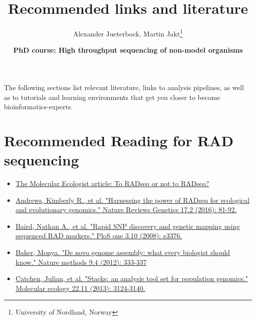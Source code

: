 \documentclass[11pt]{article}
\author{Alexander Jueterbock, Martin Jakt\thanks{University of Nordland, Norway}}
\date{\textbf{PhD course: High throughput sequencing of non-model organisms}}
\title{\textbf{Recommended links and literature}}
\begin{document}
\maketitle








The following sections list relevant literature, links to analysis
pipelines, as well as to tutorials and learning environments that get
you closer to become bioinformatics-experts.

\section{Recommended Reading for RAD sequencing}
\label{sec-1}

\begin{itemize}
\item \href{http://www.molecularecologist.com/2017/04/to-radseq-or-not-to-radseq/}{The Molecular Ecologist article: To RADseq or not to RADseq?}
\end{itemize}


\begin{itemize}
\item \href{https://www.nature.com/nrg/journal/v17/n2/full/nrg.2015.28.html}{Andrews, Kimberly R., et al. "Harnessing the power of RADseq for ecological and evolutionary genomics." Nature Reviews Genetics 17.2 (2016): 81-92.}
\end{itemize}


\begin{itemize}
\item \href{http://journals.plos.org/plosone/article?id=10.1371/journal.pone.0003376}{Baird, Nathan A., et al. "Rapid SNP discovery and genetic mapping using sequenced RAD markers." PloS one 3.10 (2008): e3376.}
\end{itemize}


\begin{itemize}
\item \href{http://www.nature.com/nmeth/journal/v9/n4/full/nmeth.1935.html}{Baker, Monya. "De novo genome assembly: what every biologist should know." Nature methods 9.4 (2012): 333-337}
\end{itemize}


\begin{itemize}
\item \href{http://onlinelibrary.wiley.com/doi/10.1111/mec.12354/abstract;jsessionid=259B878CB4F4CA43D108D850880842F7.f02t03?deniedAccessCustomisedMessage=&userIsAuthenticated=false}{Catchen, Julian, et al. "Stacks: an analysis tool set for population genomics." Molecular ecology 22.11 (2013): 3124-3140.}
\end{itemize}
\end{document}
